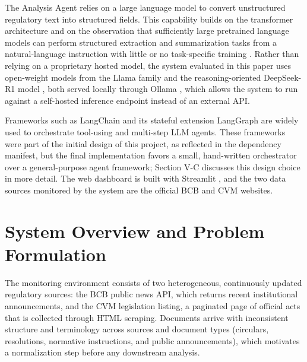 \documentclass[conference]{IEEEtran}
\begin{document}
The Analysis Agent relies on a large language model to convert unstructured regulatory text into structured fields. This capability builds on the transformer architecture \cite{b2} and on the observation that sufficiently large pretrained language models can perform structured extraction and summarization tasks from a natural-language instruction with little or no task-specific training \cite{b3}. Rather than relying on a proprietary hosted model, the system evaluated in this paper uses open-weight models from the Llama family \cite{b4} and the reasoning-oriented DeepSeek-R1 model \cite{b5}, both served locally through Ollama \cite{b6}, which allows the system to run against a self-hosted inference endpoint instead of an external API.

Frameworks such as LangChain and its stateful extension LangGraph \cite{b7} are widely used to orchestrate tool-using and multi-step LLM agents. These frameworks were part of the initial design of this project, as reflected in the dependency manifest, but the final implementation favors a small, hand-written orchestrator over a general-purpose agent framework; Section V-C discusses this design choice in more detail. The web dashboard is built with Streamlit \cite{b8}, and the two data sources monitored by the system are the official BCB \cite{b9} and CVM \cite{b10} websites.


\section{System Overview and Problem Formulation}

The monitoring environment consists of two heterogeneous, continuously updated regulatory sources: the BCB public news API, which returns recent institutional announcements, and the CVM legislation listing, a paginated page of official acts that is collected through HTML scraping. Documents arrive with inconsistent structure and terminology across sources and document types (circulars, resolutions, normative instructions, and public announcements), which motivates a normalization step before any downstream analysis.
\end{document}
